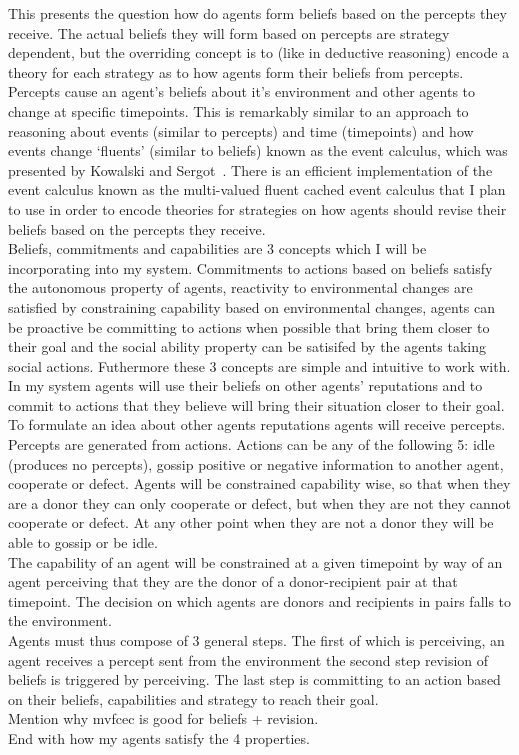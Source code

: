 \documentclass[twoside,twocolumn]{article}
\begin{document}
This presents the question how do agents form beliefs based on the percepts they receive. The actual beliefs they will form based on percepts are strategy dependent, but the overriding concept is to (like in deductive reasoning) encode a theory for each strategy as to how agents form their beliefs from percepts.\\
Percepts cause an agent's beliefs about it's environment and other agents to change at specific timepoints. This is remarkably similar to an approach to reasoning about events (similar to percepts) and time (timepoints) and how events change `fluents' (similar to beliefs) known as the event calculus, which was presented by Kowalski and Sergot~\cite{kowalski1989logic}. There is an efficient implementation of the event calculus known as the multi-valued fluent cached event calculus that I plan to use in order to encode theories for strategies on how agents should revise their beliefs based on the percepts they receive.\\



Beliefs, commitments and capabilities are 3 concepts which I will be incorporating into my system. Commitments to actions based on beliefs satisfy the autonomous property of agents, reactivity to environmental changes are satisfied by constraining capability based on environmental changes, agents can be proactive be committing to actions when possible that bring them closer to their goal and the social ability property can be satisifed by the agents taking social actions. Futhermore these 3 concepts are simple and intuitive to work with.\\

In my system agents will use their beliefs on other agents' reputations and to commit to actions that they believe will bring their situation closer to their goal. To formulate an idea about other agents reputations agents will receive percepts. Percepts are generated from actions. Actions can be any of the following 5: idle (produces no percepts), gossip positive or negative information to another agent, cooperate or defect. Agents will be constrained capability wise, so that when they are a donor they can only cooperate or defect, but when they are not they cannot cooperate or defect. At any other point when they are not a donor they will be able to gossip or be idle.\\
The capability of an agent will be constrained at a given timepoint by way of an agent perceiving that they are the donor of a donor-recipient pair at that timepoint. The decision on which agents are donors and recipients in pairs falls to the environment.\\
Agents must thus compose of 3 general steps. The first of which is perceiving, an agent receives a percept sent from the environment the second step revision of beliefs is triggered by perceiving. The last step is committing to an action based on their beliefs, capabilities and strategy to reach their goal.\\
Mention why mvfcec is good for beliefs + revision.\\
End with how my agents satisfy the 4 properties.
\end{document}
